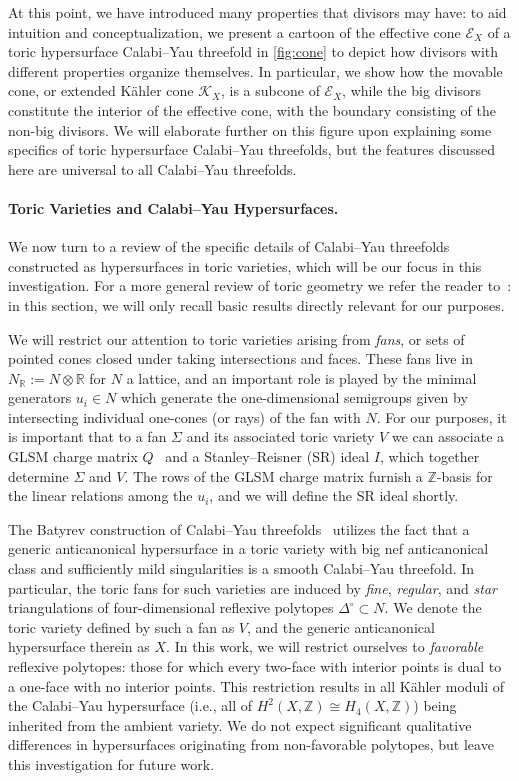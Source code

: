 \documentclass[11pt,dvipsnames]{article}
\theoremstyle{definition}
\begin{document}
At this point, we have introduced many properties that divisors may have: to aid intuition and conceptualization, we present a cartoon of the effective cone $\mathcal{E}_X$ of a toric hypersurface Calabi--Yau threefold in \cref{fig:cone} to depict how divisors with different properties organize themselves. In particular, we show how the movable cone, or extended K\"ahler cone $\mathcal{K}_X$, is a subcone of $\mathcal{E}_X$, while the big divisors constitute the interior of the effective cone, with the boundary consisting of the non-big divisors. We will elaborate further on this figure upon explaining some specifics of toric hypersurface Calabi--Yau threefolds, but the features discussed here are universal to all Calabi--Yau threefolds.

\paragraph{Toric Varieties and Calabi--Yau Hypersurfaces.} We now turn to a review of the specific details of Calabi--Yau threefolds constructed as hypersurfaces in toric varieties, which will be our focus in this investigation. For a more general review of toric geometry we refer the reader to~\cite{cls, Hori:2003ic}: in this section, we will only recall basic results directly relevant for our purposes. 

We will restrict our attention to toric varieties arising from \textit{fans}, or sets of pointed cones closed under taking intersections and faces. These fans live in $N_\mathbb{R} := N \otimes \mathbb{R}$ for $N$ a lattice, and an important role is played by the minimal generators $u_i \in N$ which generate the one-dimensional semigroups given by intersecting individual one-cones (or rays) of the fan with $N$. For our purposes, it is important that to a fan $\Sigma$ and its associated toric variety $V$ we can associate a GLSM charge matrix $Q$~\cite{Witten:1993yc} and a Stanley--Reisner (SR) ideal $I$, which together determine $\Sigma$ and $V$. The rows of the GLSM charge matrix furnish a $\mathbb{Z}$-basis for the linear relations among the $u_i$, and we will define the SR ideal shortly.

The Batyrev construction of Calabi--Yau threefolds~\cite{batyrev1993dualpolyhedramirrorsymmetry} utilizes the fact that a generic anticanonical hypersurface in a toric variety with big nef anticanonical class and sufficiently mild singularities is a smooth Calabi--Yau threefold. In particular, the toric fans for such varieties are induced by \textit{fine}, \textit{regular}, and \textit{star} triangulations of four-dimensional reflexive polytopes $\Delta^\circ \subset N$. We denote the toric variety defined by such a fan as $V$, and the generic anticanonical hypersurface therein as $X$. In this work, we will restrict ourselves to \textit{favorable} reflexive polytopes: those for which every two-face with interior points is dual to a one-face with no interior points. This restriction results in all K\"ahler moduli of the Calabi--Yau hypersurface (i.e., all of $H^2(X, \mathbb{Z}) \cong H_4(X, \mathbb{Z})$) being inherited from the ambient variety. We do not expect significant qualitative differences in hypersurfaces originating from non-favorable polytopes, but leave this investigation for future work. 
\end{document}
